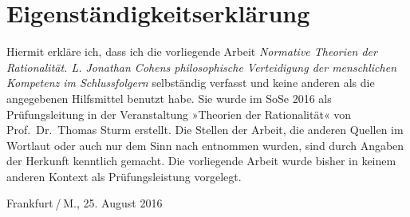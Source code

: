 \endgroup
\newpage

\section*{Eigenständigkeitserklärung}\label{eigenstuxe4ndigkeitserkluxe4rung}

Hiermit erkläre ich, dass ich die vorliegende Arbeit \emph{Normative
Theorien der Rationalität. L. Jonathan Cohens philosophische
Verteidigung der menschlichen Kompetenz im Schlussfolgern} selbständig
verfasst und keine anderen als die angegebenen Hilfsmittel benutzt habe.
Sie wurde im SoSe 2016 als Prüfungsleitung in der Veranstaltung
»Theorien der Rationalität« von Prof.~Dr.~Thomas Sturm erstellt. Die
Stellen der Arbeit, die anderen Quellen im Wortlaut oder auch nur dem
Sinn nach entnommen wurden, sind durch Angaben der Herkunft kenntlich
gemacht. Die vorliegende Arbeit wurde bisher in keinem anderen Kontext
als Prüfungsleistung vorgelegt. \vspace{3em}

\noindent Frankfurt / M., 25. August 2016

